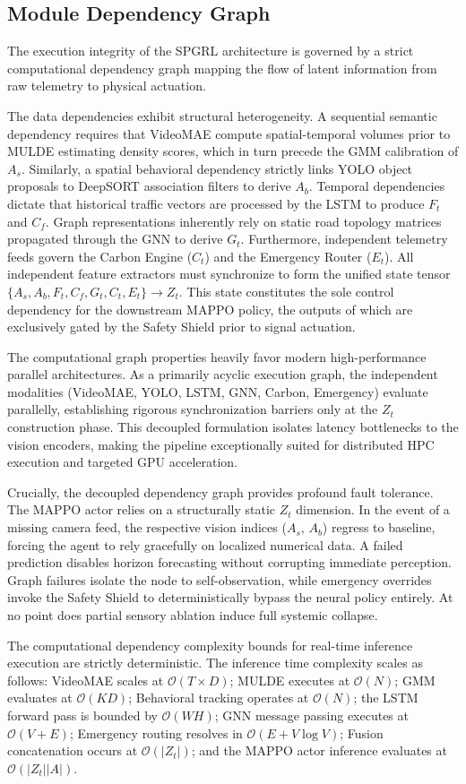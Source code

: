 \subsection{Module Dependency Graph}
The execution integrity of the SPGRL architecture is governed by a strict computational dependency graph mapping the flow of latent information from raw telemetry to physical actuation.

The data dependencies exhibit structural heterogeneity. A sequential semantic dependency requires that VideoMAE compute spatial-temporal volumes prior to MULDE estimating density scores, which in turn precede the GMM calibration of $A_s$. Similarly, a spatial behavioral dependency strictly links YOLO object proposals to DeepSORT association filters to derive $A_b$. Temporal dependencies dictate that historical traffic vectors are processed by the LSTM to produce $F_t$ and $C_f$. Graph representations inherently rely on static road topology matrices propagated through the GNN to derive $G_t$. Furthermore, independent telemetry feeds govern the Carbon Engine ($C_t$) and the Emergency Router ($E_t$). All independent feature extractors must synchronize to form the unified state tensor $\{A_s, A_b, F_t, C_f, G_t, C_t, E_t\} \rightarrow Z_t$. This state constitutes the sole control dependency for the downstream MAPPO policy, the outputs of which are exclusively gated by the Safety Shield prior to signal actuation.

The computational graph properties heavily favor modern high-performance parallel architectures. As a primarily acyclic execution graph, the independent modalities (VideoMAE, YOLO, LSTM, GNN, Carbon, Emergency) evaluate parallelly, establishing rigorous synchronization barriers only at the $Z_t$ construction phase. This decoupled formulation isolates latency bottlenecks to the vision encoders, making the pipeline exceptionally suited for distributed HPC execution and targeted GPU acceleration.

Crucially, the decoupled dependency graph provides profound fault tolerance. The MAPPO actor relies on a structurally static $Z_t$ dimension. In the event of a missing camera feed, the respective vision indices ($A_s$, $A_b$) regress to baseline, forcing the agent to rely gracefully on localized numerical data. A failed prediction disables horizon forecasting without corrupting immediate perception. Graph failures isolate the node to self-observation, while emergency overrides invoke the Safety Shield to deterministically bypass the neural policy entirely. At no point does partial sensory ablation induce full systemic collapse.

The computational dependency complexity bounds for real-time inference execution are strictly deterministic. The inference time complexity scales as follows: VideoMAE scales at $\mathcal{O}(T \times D)$; MULDE executes at $\mathcal{O}(N)$; GMM evaluates at $\mathcal{O}(KD)$; Behavioral tracking operates at $\mathcal{O}(N)$; the LSTM forward pass is bounded by $\mathcal{O}(WH)$; GNN message passing executes at $\mathcal{O}(V+E)$; Emergency routing resolves in $\mathcal{O}(E+V\log V)$; Fusion concatenation occurs at $\mathcal{O}(|Z_t|)$; and the MAPPO actor inference evaluates at $\mathcal{O}(|Z_t||A|)$.
